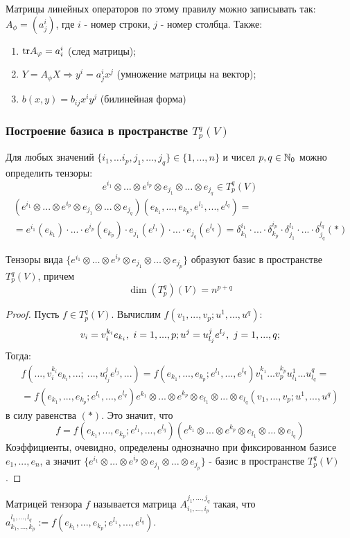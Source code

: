 Матрицы линейных операторов по этому правилу можно записывать так: $A_\phi = (a_j^i)$, где $i$ - номер строки, $j$ - номер столбца. Также:
\begin{enumerate}
    \item $\textup{tr} A_\phi = a_i^i$ (след матрицы);
    \item $Y = A_\phi X \Longrightarrow y^i = a_j^ix^j$ (умножение матрицы на вектор);
    \item $b(x, y) = b_{ij}x^iy^j$ (билинейная форма)
\end{enumerate}

\subsubsection*{Построение базиса в пространстве $T_p^q(V)$}
Для любых значений $\{i_1,\dots i_p,j_1,\dots,j_q\}\in \{1,\dots,n\}$ и чисел $p,q \in \N_0$ можно определить тензоры:
\[e^{i_1}\otimes \dots \otimes e^{i_p}\otimes e_{j_1}\otimes \dots\otimes e_{j_q}\in T_p^q(V)\]
\begin{multline*}
    (e^{i_1}\otimes ... \otimes e^{i_p}\otimes e_{j_1}\otimes ... \otimes e_{j_q})(e_{k_1}, ... ,e_{k_p},e^{l_1},...,e^{l_q})=\\
    =e^{i_1}(e_{k_1})\cdot ... \cdot e^{i_p}(e_{k_p})\cdot e_{j_1}(e^{l_1})\cdot \dots \cdot e_{j_q}(e^{l_q}) = \delta_{k_1}^{i_1}\cdot ... \cdot \delta_{k_p}^{i_p} \cdot \delta_{j_1}^{l_1}\cdot ... \cdot \delta_{j_q}^{l_q} (*)
\end{multline*}
\begin{theorem}
    Тензоры вида $\{e^{i_1}\otimes \dots \otimes e^{i_p}\otimes e_{j_1}\otimes \dots\otimes e_{j_p}\}$ образуют базис в пространстве $T_p^q(V)$, причем
    \[\dim{(T_p^q)}(V)=n^{p+q}\]
\end{theorem}
\begin{proof}
    Пусть $f \in T_p^q(V)$. Вычислим $f(v_1,...,v_p; u^1,...,u^q)$:
    \[v_i = v_i^{k_i}e_{k_i}, \ i = 1,...,p; \\ u^j = u_{l_j}^j e^{l_j}, \ j = 1,...,q;\]
    Тогда:
    \begin{multline*}
        f(...,v_i^{k_i}e_{k_i},...; \ ...,u_{l_j}^j e^{l_j},...) = f(e_{k_1},...,e_{k_p}; e^{l_1},...,e^{l_q})v_1^{k_1}...v_p^{k_p}u_{l_1}^1...u_{l_q}^q =\\= f(e_{k_1},...,e_{k_p}; e^{l_1},...,e^{l_q}) e^{k_1}\otimes...\otimes e^{k_p}\otimes e_{l_1}\otimes...\otimes  e_{l_q} (v_1,...,v_p; u^1,...,u^q) 
    \end{multline*}
    в силу равенства $(*)$. Это значит, что
    \[f = f(e_{k_1},...,e_{k_p}; e^{l_1},...,e^{l_q})(e^{k_1}\otimes...\otimes e^{k_p}\otimes e_{l_1}\otimes...\otimes e_{l_q})\]
    Коэффициенты, очевидно, определены однозначно при фиксированном базисе $e_1,...,e_n$, а значит $\{e^{i_1}\otimes \dots \otimes e^{i_p}\otimes e_{j_1}\otimes \dots\otimes e_{j_p}\}$ - базис в пространстве $T_p^q(V)$.  
\end{proof}
\begin{definition}
    Матрицей тензора $f$ называется матрица $A_{i_1,...,i_p}^{j_1,...,j_q}$ такая, что $a_{k_1,...,k_p}^{l_1,...,l_q} := f(e_{k_1},...,e_{k_p}; e^{l_1},...,e^{l_q})$.
\end{definition}
